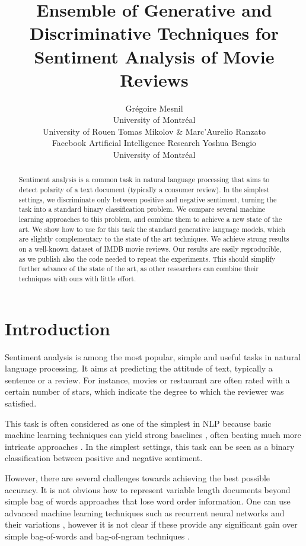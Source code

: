 \documentclass{article} %
\title{Ensemble of Generative and Discriminative Techniques for Sentiment Analysis of Movie Reviews}
\author{
    Gr\'{e}goire Mesnil \\
    University of Montr\'{e}al \\
    University of Rouen
\And
Tomas Mikolov \& Marc'Aurelio Ranzato \\ 
Facebook Artificial Intelligence Research
\And
Yoshua Bengio \\%
University of Montr\'{e}al
}
\begin{document}
\maketitle

\begin{abstract} Sentiment analysis is a common task in natural language
processing that aims to detect polarity of a text document (typically a
consumer review). In the simplest settings, we discriminate only between
positive and negative sentiment, turning the task into a standard binary
classification problem. We compare several machine learning approaches to this
problem, and combine them to achieve a new state of the art. We show how to
use for this task the standard generative language models, which are slightly
complementary to the state of the art techniques. We achieve strong results on
a well-known dataset of IMDB movie reviews. Our results are easily
reproducible, as we publish also the code needed to repeat the experiments.
This should simplify further advance of the state of the art, as other
researchers can combine their techniques with ours with little effort.
\end{abstract}

\section{Introduction}

Sentiment analysis is among the most popular, simple and useful tasks in
natural language processing. It aims at predicting the attitude of text,
typically a sentence or a review. For instance, movies or restaurant are often
rated with a certain number of stars, which indicate the degree to which the
reviewer was satisfied.

This task is often considered as one of the simplest in NLP because basic
machine learning techniques can yield strong baselines \citep{Wang2012},
often beating much more intricate approaches \citep{Socher2011}. In the simplest
settings, this task can be seen as a binary classification between positive and
negative sentiment.

However, there are several challenges towards achieving the best possible
accuracy. It is not obvious how to represent variable length documents beyond
simple bag of words approaches that lose word order information. One can use
advanced machine learning techniques such as recurrent neural networks and
their variations \citep{Mikolov2010, Socher2011}, however it is not clear if
these provide any significant gain over simple bag-of-words and bag-of-ngram
techniques \citep{Pang2008, Wang2012}.
\end{document}
